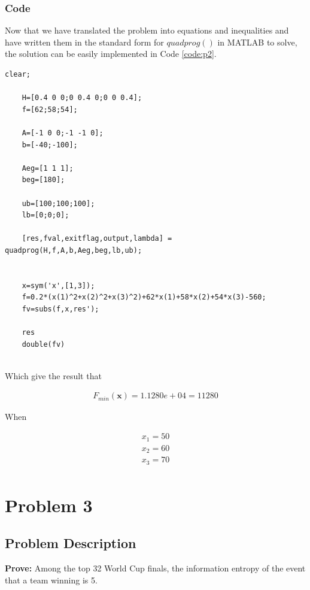 \documentclass[12pt]{article}
\begin{document}
\subsubsection{Code}

Now that we have translated the problem into equations and inequalities and have written them in the standard form for $quadprog()$ in MATLAB to solve, the solution can be easily implemented in Code \ref{code:p2}.

\begin{lstlisting}[style=MatlabStyle,caption=Solve using $quadprog()$,label=code:p2]
	clear;
	
	H=[0.4 0 0;0 0.4 0;0 0 0.4];
	f=[62;58;54];
	
	A=[-1 0 0;-1 -1 0];
	b=[-40;-100];
	
	Aeg=[1 1 1];
	beg=[180];
	
	ub=[100;100;100];
	lb=[0;0;0];
	
	[res,fval,exitflag,output,lambda] = quadprog(H,f,A,b,Aeg,beg,lb,ub);
	
	
	x=sym('x',[1,3]);
	f=0.2*(x(1)^2+x(2)^2+x(3)^2)+62*x(1)+58*x(2)+54*x(3)-560;
	fv=subs(f,x,res');
	
	res
	double(fv)
	
\end{lstlisting}

Which give the result that

\begin{equation}
	\begin{aligned}
		F_{min}(\mathbf{x})=1.1280e+04=11280
	\end{aligned}
\end{equation}

When

\begin{equation}
	\begin{aligned}
		x_1 = 50 \\
		x_2 = 60 \\
		x_3 = 70 \\
	\end{aligned}
\end{equation}

\section{Problem 3}

\subsection{Problem Description}
\textbf{Prove:} Among the top 32 World Cup finals, the information entropy of the event that a team winning is 5.
\end{document}
